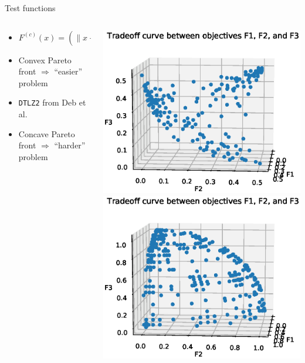 \documentclass[xcolor=dvipsnames]{beamer}
\begin{document}
\begin{frame}{Test functions}
\begin{columns}
\begin{column}{.58\textwidth}
\begin{itemize}
\item $F^{(c)}(x) = (\|x - 0.5e^{(1)}\|_2^2, \ldots, \|x - 0.5e^{(p)}\|_2^2)$
\item Convex Pareto front $\Rightarrow$ ``easier'' problem
\end{itemize}
\bigskip\bigskip
\begin{itemize}
\item {\tt DTLZ2} from Deb et al.
\item Concave Pareto front $\Rightarrow$ ``harder'' problem
\end{itemize}
\end{column}
\begin{column}{.4\textwidth}
\bigskip
\includegraphics[width=\textwidth]{f_conv_2.eps}\\
\includegraphics[width=\textwidth]{dtlz2_2.eps}
\end{column}
\end{columns}
\end{frame}
\end{document}
